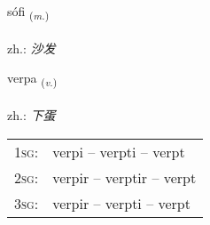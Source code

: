 \documentclass[frontgrid, backgrid]{flacards}\usepackage[]{graphicx}\usepackage[]{xcolor}
\begin{document}
\renewcommand{\flhead}{\vskip5pt \fboxsep=0pt {\small\bfseries\footnotesize Nafnorð | 名词}}
\renewcommand{\fcfoot}{\vskip5pt \fboxsep=0pt \hspace{2pt}{\small\bfseries\footnotesize 3K}}

\renewcommand{\blhead}{\vskip5pt {\small\bfseries\footnotesize Nafnorð | 名词 }}
\renewcommand{\bcfoot}{\vskip5pt \hspace{2pt}{\small\bfseries\footnotesize 3K}}


{sófi \small{\textsubscript{(\textit{m.})}} \\[1ex] %
\textphonetic{[souːfɪ]} \\
zh.: \emph{沙发} \\  [2ex]
\renewcommand*{\arraystretch}{0.8}
}

\renewcommand{\flhead}{\vskip5pt \fboxsep=0pt {\small\bfseries\footnotesize Sagnorð | 动词}}
\renewcommand{\fcfoot}{\vskip5pt \fboxsep=0pt \hspace{2pt}{\small\bfseries\footnotesize 3K}}

\renewcommand{\blhead}{\vskip5pt {\small\bfseries\footnotesize Sagnorð | 动词 }}
\renewcommand{\bcfoot}{\vskip5pt \hspace{2pt}{\small\bfseries\footnotesize 3K}}


{verpa \small{\textsubscript{(\textit{v.})}} \\[1ex] %
\textphonetic{[vɛr̥pa]} \\
zh.: \emph{下蛋} \\  [2ex]
\renewcommand*{\arraystretch}{0.8}
\begin{tabular}{p{1cm}l}
\textsc{1sg}: & verpi -- verpti -- verpt \\ 
\textsc{2sg}: & verpir -- verptir -- verpt \\ 
\textsc{3sg}: & verpir -- verpti -- verpt \\ 
\end{tabular}
}
\end{document}
